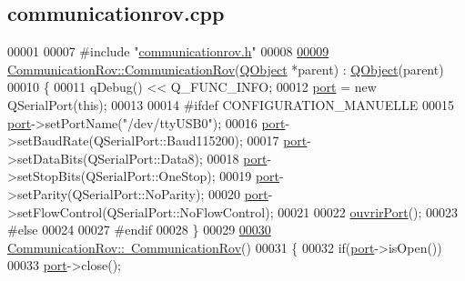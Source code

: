 \hypertarget{communicationrov_8cpp_source}{}\subsection{communicationrov.\+cpp}
\label{communicationrov_8cpp_source}

\begin{DoxyCode}
00001 
00007 \textcolor{preprocessor}{#include "\hyperlink{communicationrov_8h}{communicationrov.h}"}
00008 
\hyperlink{class_communication_rov_a22b64c69228d392a212f543e071adc02}{00009} \hyperlink{class_communication_rov_a22b64c69228d392a212f543e071adc02}{CommunicationRov::CommunicationRov}(\hyperlink{class_q_object}{QObject} *parent) : 
      \hyperlink{class_q_object}{QObject}(parent)
00010 \{
00011     qDebug() << Q\_FUNC\_INFO;
00012     \hyperlink{class_communication_rov_a21b62067ef0b2a6aec339df60b4abd72}{port} = \textcolor{keyword}{new} QSerialPort(\textcolor{keyword}{this});
00013 
00014 \textcolor{preprocessor}{    #ifdef CONFIGURATION\_MANUELLE}
00015         \hyperlink{class_communication_rov_a21b62067ef0b2a6aec339df60b4abd72}{port}->setPortName(\textcolor{stringliteral}{"/dev/ttyUSB0"});
00016         \hyperlink{class_communication_rov_a21b62067ef0b2a6aec339df60b4abd72}{port}->setBaudRate(QSerialPort::Baud115200);
00017         \hyperlink{class_communication_rov_a21b62067ef0b2a6aec339df60b4abd72}{port}->setDataBits(QSerialPort::Data8);
00018         \hyperlink{class_communication_rov_a21b62067ef0b2a6aec339df60b4abd72}{port}->setStopBits(QSerialPort::OneStop);
00019         \hyperlink{class_communication_rov_a21b62067ef0b2a6aec339df60b4abd72}{port}->setParity(QSerialPort::NoParity);
00020         \hyperlink{class_communication_rov_a21b62067ef0b2a6aec339df60b4abd72}{port}->setFlowControl(QSerialPort::NoFlowControl);
00021 
00022         \hyperlink{class_communication_rov_acc835a6d927b1b8cd631e64ffabca0b4}{ouvrirPort}();
00023 \textcolor{preprocessor}{    #else}
00024 
00027 \textcolor{preprocessor}{    #endif}
00028 \}
00029 
\hyperlink{class_communication_rov_a97e96f47dad6d47cbec4adc82756b49e}{00030} \hyperlink{class_communication_rov_a97e96f47dad6d47cbec4adc82756b49e}{CommunicationRov::~CommunicationRov}()
00031 \{
00032     \textcolor{keywordflow}{if}(\hyperlink{class_communication_rov_a21b62067ef0b2a6aec339df60b4abd72}{port}->isOpen())
00033         \hyperlink{class_communication_rov_a21b62067ef0b2a6aec339df60b4abd72}{port}->close();

\end{DoxyCode}
